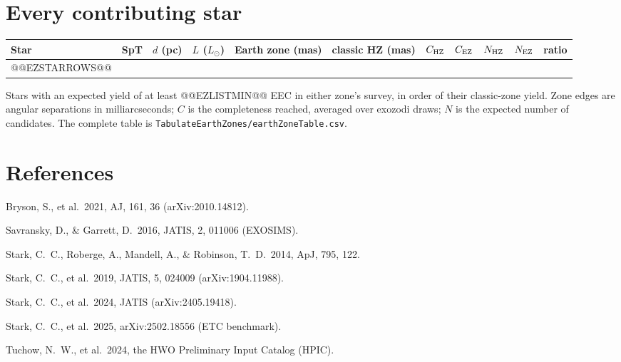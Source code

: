 \documentclass[11pt,a4paper]{article}
\begin{document}
\section{Every contributing star}
\label{app:stars}

{\scriptsize
\setlength{\tabcolsep}{3pt}
\begin{longtable}{llrrrrrrrrr}
\toprule
\textbf{Star} & \textbf{SpT} & \textbf{$d$ (pc)} & \textbf{$L$ ($L_\odot$)} & \textbf{Earth zone (mas)} & \textbf{classic HZ (mas)} & \textbf{$C_{\rm HZ}$} & \textbf{$C_{\rm EZ}$} & \textbf{$N_{\rm HZ}$} & \textbf{$N_{\rm EZ}$} & \textbf{ratio} \\
\midrule
\endhead
@@EZSTARROWS@@
\bottomrule
\end{longtable}
}

Stars with an expected yield of at least @@EZLISTMIN@@ EEC in either zone's survey, in order of
their classic-zone yield. Zone edges are angular separations in milliarcseconds; $C$ is the
completeness reached, averaged over exozodi draws; $N$ is the expected number of candidates. The
complete table is \texttt{TabulateEarthZones/earthZoneTable.csv}.

\section*{References}

\begin{description}\small
\item[{[bryson2021]}] Bryson, S., et al.\ 2021, AJ, 161, 36 (arXiv:2010.14812).
\item[{[savransky2016]}] Savransky, D., \& Garrett, D.\ 2016, JATIS, 2, 011006 (EXOSIMS).
\item[{[stark2014]}] Stark, C.~C., Roberge, A., Mandell, A., \& Robinson, T.~D.\ 2014, ApJ, 795, 122.
\item[{[stark2019]}] Stark, C.~C., et al.\ 2019, JATIS, 5, 024009 (arXiv:1904.11988).
\item[{[stark2024]}] Stark, C.~C., et al.\ 2024, JATIS (arXiv:2405.19418).
\item[{[stark2025]}] Stark, C.~C., et al.\ 2025, arXiv:2502.18556 (ETC benchmark).
\item[{[tuchow2024]}] Tuchow, N.~W., et al.\ 2024, the HWO Preliminary Input Catalog (HPIC).
\end{description}
\end{document}
